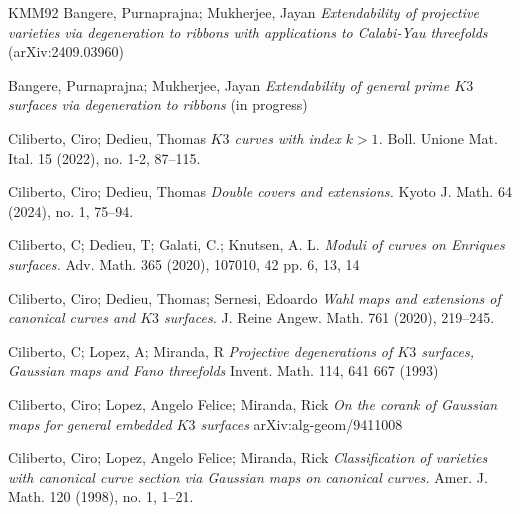 \documentclass[11pt,twoside]{amsart}
\theoremstyle{plain}
\numberwithin{equation}{section}
\theoremstyle{definition}
\begin{document}
\begin{thebibliography}{KMM92}
Bangere, Purnaprajna; Mukherjee, Jayan  
\emph{Extendability of projective varieties via degeneration to ribbons with applications to Calabi-Yau threefolds} (arXiv:2409.03960)

Bangere, Purnaprajna; Mukherjee, Jayan  
\emph{Extendability of general prime $K3$ surfaces via degeneration to ribbons} (in progress)






Ciliberto, Ciro; Dedieu, Thomas
\emph{$K3$ curves with index $k>1$.}
Boll. Unione Mat. Ital. 15 (2022), no. 1-2, 87–115.

Ciliberto, Ciro; Dedieu, Thomas
\emph{Double covers and extensions.}
Kyoto J. Math. 64 (2024), no. 1, 75–94.


Ciliberto, C; Dedieu, T;  Galati, C.; Knutsen, A. L.  
\emph{Moduli of curves on Enriques surfaces.}
Adv. Math. 365 (2020), 107010, 42 pp. 6, 13, 14

Ciliberto, Ciro; Dedieu, Thomas; Sernesi, Edoardo
\emph{Wahl maps and extensions of canonical curves and $K3$ surfaces.}
J. Reine Angew. Math. 761 (2020), 219–245.

Ciliberto, C; Lopez, A; Miranda, R
\emph{Projective degenerations of $K3$ surfaces, Gaussian maps and Fano threefolds}
Invent. Math. 114, 641 667 (1993)

Ciliberto, Ciro; Lopez, Angelo Felice; Miranda, Rick
\emph{On the corank of Gaussian maps for general embedded $K3$ surfaces}
arXiv:alg-geom/9411008

Ciliberto, Ciro; Lopez, Angelo Felice; Miranda, Rick
\emph{Classification of varieties with canonical curve section via Gaussian maps on canonical curves.}
Amer. J. Math.   120 (1998), no. 1, 1–21.


\end{thebibliography}
\end{document}
